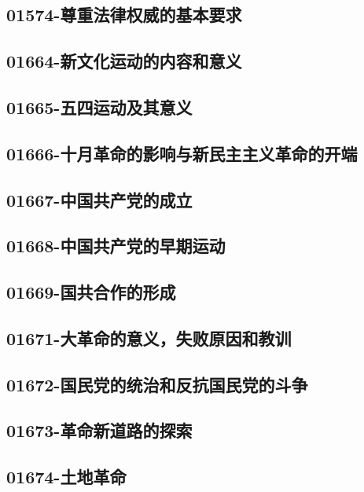 \subsection{01574-尊重法律权威的基本要求}

\subsection{01664-新文化运动的内容和意义}

\subsection{01665-五四运动及其意义}

\subsection{01666-十月革命的影响与新民主主义革命的开端}

\subsection{01667-中国共产党的成立}

\subsection{01668-中国共产党的早期运动}

\subsection{01669-国共合作的形成}

\subsection{01671-大革命的意义，失败原因和教训}

\subsection{01672-国民党的统治和反抗国民党的斗争}

\subsection{01673-革命新道路的探索}

\subsection{01674-土地革命}

